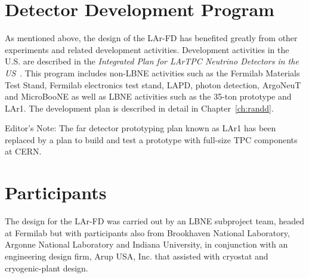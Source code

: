 \section{Detector Development Program}


As mentioned above, the design of the LAr-FD has benefited greatly from other experiments and related development activities. Development activities in the U.S. are described in the  {\em Integrated Plan for LArTPC Neutrino Detectors in the US}~\cite{IP}. This program includes non-LBNE activities such as the Fermilab Materials Test Stand, Fermilab electronics test stand, LAPD, photon detection, ArgoNeuT and MicroBooNE as well as LBNE activities such as the 35-ton prototype and LAr1. The development plan is described in detail in Chapter~\ref{ch:randd}.


\begin{editornote}
  Editor's Note: The far detector prototyping plan known as LAr1 has been replaced by a plan to build and test a prototype with full-size TPC components at CERN.
\end{editornote}


\section{Participants}


The design for the LAr-FD was carried out by an LBNE subproject team, headed at Fermilab  but with participants also from Brookhaven National Laboratory, Argonne National Laboratory and Indiana  University, in conjunction with an engineering design firm, Arup USA, Inc. that assisted with cryostat and cryogenic-plant design. 


